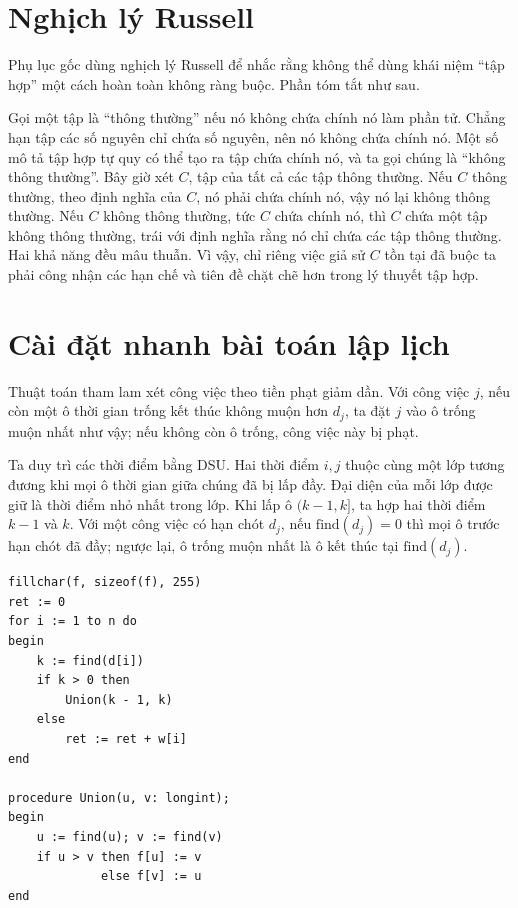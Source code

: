 \documentclass[11pt]{article}
\begin{document}
\appendix

\section{Nghịch lý Russell}

Phụ lục gốc dùng nghịch lý Russell để nhắc rằng không thể dùng khái niệm
``tập hợp'' một cách hoàn toàn không ràng buộc. Phần tóm tắt như sau.

Gọi một tập là ``thông thường'' nếu nó không chứa chính nó làm phần tử. Chẳng
hạn tập các số nguyên chỉ chứa số nguyên, nên nó không chứa chính nó. Một số
mô tả tập hợp tự quy có thể tạo ra tập chứa chính nó, và ta gọi chúng là
``không thông thường''. Bây giờ xét \(C\), tập của tất cả các tập thông
thường. Nếu \(C\) thông thường, theo định nghĩa của \(C\), nó phải chứa chính
nó, vậy nó lại không thông thường. Nếu \(C\) không thông thường, tức \(C\) chứa
chính nó, thì \(C\) chứa một tập không thông thường, trái với định nghĩa rằng
nó chỉ chứa các tập thông thường. Hai khả năng đều mâu thuẫn. Vì vậy, chỉ
riêng việc giả sử \(C\) tồn tại đã buộc ta phải công nhận các hạn chế và tiên
đề chặt chẽ hơn trong lý thuyết tập hợp.

\section{Cài đặt nhanh bài toán lập lịch}

Thuật toán tham lam xét công việc theo tiền phạt giảm dần. Với công việc
\(j\), nếu còn một ô thời gian trống kết thúc không muộn hơn \(d_j\), ta đặt
\(j\) vào ô trống muộn nhất như vậy; nếu không còn ô trống, công việc này bị
phạt.

Ta duy trì các thời điểm bằng DSU. Hai thời điểm \(i,j\) thuộc cùng một lớp
tương đương khi mọi ô thời gian giữa chúng đã bị lấp đầy. Đại diện của mỗi
lớp được giữ là thời điểm nhỏ nhất trong lớp. Khi lấp ô \((k-1,k]\), ta hợp
hai thời điểm \(k-1\) và \(k\). Với một công việc có hạn chót \(d_j\), nếu
\(\mathrm{find}(d_j)=0\) thì mọi ô trước hạn chót đã đầy; ngược lại, ô trống
muộn nhất là ô kết thúc tại \(\mathrm{find}(d_j)\).

\begin{verbatim}
fillchar(f, sizeof(f), 255)
ret := 0
for i := 1 to n do
begin
    k := find(d[i])
    if k > 0 then
        Union(k - 1, k)
    else
        ret := ret + w[i]
end

procedure Union(u, v: longint);
begin
    u := find(u); v := find(v)
    if u > v then f[u] := v
             else f[v] := u
end
\end{verbatim}
\end{document}
